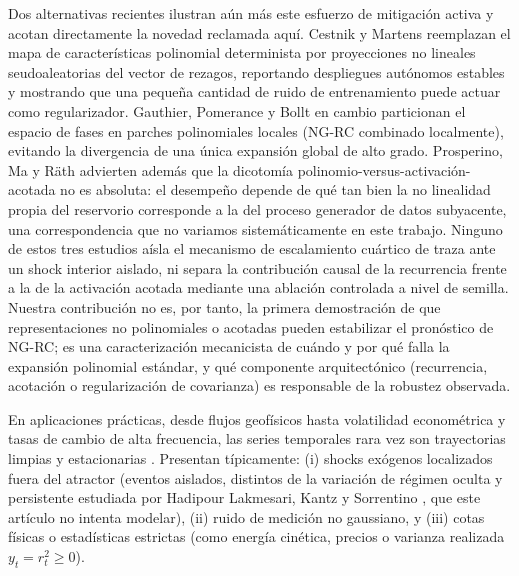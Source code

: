 \documentclass[aip,cha,reprint,amsmath,amssymb]{revtex4-2}
\begin{document}
Dos alternativas recientes ilustran aún más este esfuerzo de mitigación activa y acotan directamente la novedad reclamada aquí. Cestnik y Martens \cite{cestnik2026ngrc} reemplazan el mapa de características polinomial determinista por proyecciones no lineales seudoaleatorias del vector de rezagos, reportando despliegues autónomos estables y mostrando que una pequeña cantidad de ruido de entrenamiento puede actuar como regularizador. Gauthier, Pomerance y Bollt \cite{gauthier2025locality} en cambio particionan el espacio de fases en parches polinomiales locales (NG-RC combinado localmente), evitando la divergencia de una única expansión global de alto grado. Prosperino, Ma y R\"ath \cite{prosperino2025tailored} advierten además que la dicotomía polinomio-versus-activación-acotada no es absoluta: el desempeño depende de qué tan bien la no linealidad propia del reservorio corresponde a la del proceso generador de datos subyacente, una correspondencia que no variamos sistemáticamente en este trabajo. Ninguno de estos tres estudios aísla el mecanismo de escalamiento cuártico de traza ante un shock interior aislado, ni separa la contribución causal de la recurrencia frente a la de la activación acotada mediante una ablación controlada a nivel de semilla. Nuestra contribución no es, por tanto, la primera demostración de que representaciones no polinomiales o acotadas pueden estabilizar el pronóstico de NG-RC; es una caracterización mecanicista de cuándo y por qué falla la expansión polinomial estándar, y qué componente arquitectónico (recurrencia, acotación o regularización de covarianza) es responsable de la robustez observada.

En aplicaciones prácticas, desde flujos geofísicos hasta volatilidad econométrica y tasas de cambio de alta frecuencia, las series temporales rara vez son trayectorias limpias y estacionarias \cite{carroll2020dimension,vlachas2020backpropagation}. Presentan típicamente: (i) shocks exógenos localizados fuera del atractor (eventos aislados, distintos de la variación de régimen oculta y persistente estudiada por Hadipour Lakmesari, Kantz y Sorrentino \cite{lakmesari2026regime}, que este artículo no intenta modelar), (ii) ruido de medición no gaussiano, y (iii) cotas físicas o estadísticas estrictas (como energía cinética, precios o varianza realizada $y_t = r_t^2 \ge 0$).
\end{document}
